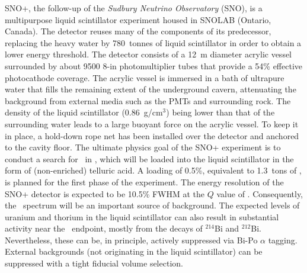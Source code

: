 SNO+, the follow-up of the \emph{Sudbury Neutrino Observatory} (SNO), is a multipurpose liquid scintillator experiment housed in SNOLAB (Ontario, Canada). The detector reuses many of the components of its predecessor, replacing the heavy water by 780~tonnes of liquid scintillator in order to obtain a lower energy threshold. The detector consists of a 12~m diameter acrylic vessel surrounded by about 9500 8-in photomultiplier tubes that provide a 54\% effective photocathode coverage. The acrylic vessel is immersed in a bath of ultrapure water that fills the remaining extent of the underground cavern, attenuating the background from external media such as the PMTs and surrounding rock. The density of the liquid scintillator (0.86~g/cm$^{3}$) being lower than that of the surrounding water leads to a large buoyant force on the acrylic vessel. To keep it in place, a hold-down rope net has been installed over the detector and anchored to the cavity floor. The ultimate physics goal of the SNO+ experiment is to conduct a search for \bbonu\ in , which will be loaded into the liquid scintillator in the form of (non-enriched) telluric acid. A loading of 0.5\%, equivalent to 1.3~tons of , is planned for the first phase of the experiment. The energy resolution of the SNO+ detector is expected to be 10.5\% FWHM at the $Q$ value of . Consequently, the \bbtnu\ spectrum will be an important source of background. The expected levels of uranium and thorium in the liquid scintillator can also result in substantial activity near the \bbonu\ endpoint, mostly from the decays of $^{214}$Bi and $^{212}$Bi. Nevertheless, these can be, in principle, actively suppressed via Bi-Po $\alpha$ tagging. External backgrounds (not originating in the liquid scintillator) can be suppressed with a tight fiducial volume selection.
